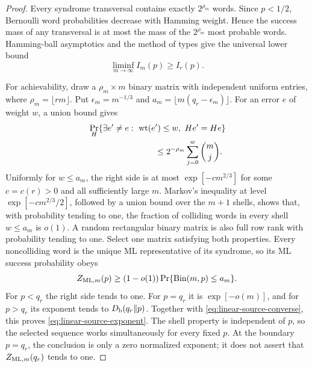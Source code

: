 \documentclass[journal]{IEEEtran}
\theoremstyle{definition}
\theoremstyle{remark}
\newcommand{\wt}{\operatorname{wt}}
\begin{document}
\begin{proof}
Every syndrome transversal contains exactly $2^{\rho_m}$ words.  Since
$p<1/2$, Bernoulli word probabilities decrease with Hamming weight.  Hence
the success mass of any transversal is at most the mass of the
$2^{\rho_m}$ most probable words.  Hamming-ball asymptotics and the method of
types give the universal lower bound
\begin{equation}
 \liminf_{m\to\infty}I_m(p)\ge I_r(p).
 \label{eq:linear-source-converse}
\end{equation}

For achievability, draw a $\rho_m\times m$ binary matrix with independent
uniform entries, where $\rho_m=\lfloor rm\rfloor$.  Put
$\epsilon_m=m^{-1/3}$ and
$a_m=\lfloor m(q_r-\epsilon_m)\rfloor$.  For an error $e$ of weight $w$, a
union bound gives
\begin{align}
 &\Pr_H\{\exists e'\ne e:\ \wt(e')\le w,\ He'=He\}
 \nonumber\\
 &\hspace{28mm}\le 2^{-\rho_m}\sum_{j=0}^{w}\binom mj.
 \label{eq:random-syndrome-collision}
\end{align}
Uniformly for $w\le a_m$, the right side is at most
$\exp[-c m^{2/3}]$ for some $c=c(r)>0$ and all sufficiently large $m$.
Markov's inequality at level $\exp[-c m^{2/3}/2]$, followed by a union bound
over the $m+1$ shells, shows that, with probability tending to one, the
fraction of colliding words in every shell $w\le a_m$ is $o(1)$.  A random
rectangular binary matrix is also full row rank with probability tending to
one.  Select one matrix satisfying both properties.  Every noncolliding word
is the unique ML representative of
its syndrome, so its ML success probability obeys
\begin{equation}
 Z_{{\rm ML},m}(p)\ge(1-o(1))
 \Pr\{\operatorname{Bin}(m,p)\le a_m\}.
 \label{eq:random-syndrome-lower}
\end{equation}
For $p<q_r$ the right side tends to one.  For $p=q_r$ it is
$\exp[-o(m)]$, and for $p>q_r$ its exponent tends to
$D_{\rm b}(q_r\Vert p)$.  Together with
\eqref{eq:linear-source-converse}, this proves
\eqref{eq:linear-source-exponent}.  The shell property is independent of
$p$, so the selected sequence works simultaneously for every fixed $p$.
At the boundary $p=q_r$, the conclusion is only a zero normalized exponent;
it does not assert that $Z_{{\rm ML},m}(q_r)$ tends to one.


\end{proof}
\end{document}
